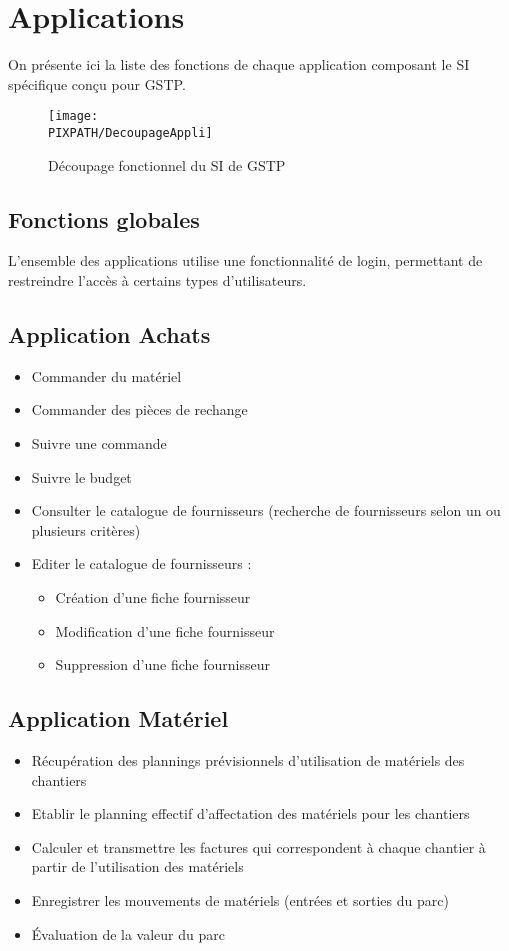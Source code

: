 \section{Applications}

On présente ici la liste des fonctions de chaque application composant le
SI spécifique conçu pour GSTP.

\begin{figure}[h]
\centering
\caption{Découpage fonctionnel du SI de GSTP}
\texttt{[image: \\PIXPATH/DecoupageAppli]}
\end{figure}


\subsection{Fonctions globales}

L'ensemble des applications utilise une fonctionnalité de login, permettant
de restreindre l'accès à certains types d'utilisateurs.


\subsection{Application Achats}

\begin{itemize}
\item Commander du matériel
\item Commander des pièces de rechange
\item Suivre une commande
\item Suivre le budget
\item Consulter le catalogue de fournisseurs (recherche de fournisseurs selon 
un ou plusieurs critères)
\item Editer le catalogue de fournisseurs :
	\begin{itemize}
	\item Création d'une fiche fournisseur
	\item Modification d'une fiche fournisseur
	\item Suppression d'une fiche fournisseur
	\end{itemize}
\end{itemize}

\subsection{Application Matériel}
\begin{itemize}
\item Récupération des plannings prévisionnels d'utilisation de matériels
des chantiers
\item Etablir le planning effectif d'affectation des
matériels pour les chantiers
\item Calculer et transmettre les factures qui correspondent à chaque chantier
à partir de l'utilisation des matériels
\item Enregistrer les mouvements de matériels (entrées et sorties du parc)
\item Évaluation de la valeur du parc
\end{itemize}


